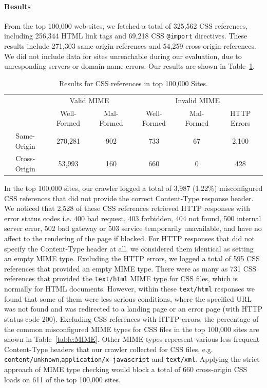 \documentclass{acm_proc_article-sp}
\begin{document}
\paragraph{Results}
From the top 100,000 web sites, we fetched a total of 325,562 CSS references, including 256,344 HTML link tags and 69,218 CSS \texttt{@import} directives. These results include 271,303 same-origin references and 54,259 cross-origin references. We did not include data for sites unreachable during our evaluation, due to unresponding servers or domain name errors. Our results are shown in Table~\ref{table:results}.

\begin{table}
\centering
\begin{tabular}{|c|c|c|c|c|c|} \hline
&\multicolumn{2}{|c}{Valid MIME}&\multicolumn{3}{|c|}{Invalid MIME}\\
\cline{2-6}
&Well-Formed&Mal-Formed&Well-Formed&Mal-Formed&HTTP Errors\\ \hline
Same-Origin&270,281&902&733&67&2,100\\ \hline
Cross-Origin&53,993&160&660&0&428\\
\hline\end{tabular}
\caption{Results for CSS references in top 100,000 Sites.}
\label{table:results}
\end{table}

In the top 100,000 sites, our crawler logged a total of 3,987 (1.22\%) misconfigured CSS references that did not provide the correct Content-Type response header. We noticed that 2,528 of these CSS references retrieved HTTP responses with error status codes i.e. 400 bad request, 403 forbidden, 404 not found, 500 internal server error, 502 bad gateway or 503 service temporarily unavailable, and have no affect to the rendering of the page if blocked. For HTTP responses that did not specify the Content-Type header at all, we considered them identical as setting an empty MIME type. Excluding the HTTP errors, we logged a total of 595 CSS references that provided an empty MIME type. There were as many as 731 CSS references that provided the \verb|text/html| MIME type for CSS files, which is normally for HTML documents. However, within these \texttt{text/html} responses we found that some of them were less serious conditions, where the specified URL was not found and was redirected to a landing page or an error page (with HTTP status code 200). Excluding CSS references with HTTP errors, the percentage of the common misconfigured MIME types for CSS files in the top 100,000 sites are shown in Table~\ref{table:MIME}. Other MIME types represent various less-frequent Content-Type headers that our crawler collected for CSS files, e.g. \verb|content/unknown|,\verb|application/x-javascript| and \verb|text/xml|. Applying the strict approach of MIME type checking would block a total of 660 cross-origin CSS loads on 611 of the top 100,000 sites.
\end{document}
